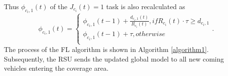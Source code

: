 \documentclass[lettersize,journal,onecolumn]{IEEEtran}
\begin{document}
Thus ${{\phi }_{{{{c}}_{i}},1}}(t)$ of the ${{J}_{{{{c}}_{i}}}}(t)=1$ task is also recalculated as
\begin{equation}
{{\phi }_{{{{c}}_{i}},1}}\left( t \right)=\left\{ \begin{matrix}
   {{\phi }_{{{{c}}_{i}},1}}\left( t-1 \right)+\frac{{{d}_{{{{c}}_{i}},1}}\left( t \right)}{{{R}_{{{{c}}_{i}}}}(t)},{ if }{{{R}}_{{{{c}}_{i}}}}(t)\cdot \tau \ge {{d}_{{{{c}}_{i}},1}}{                   }  \\
   {{\phi }_{{{{c}}_{i}},1}}\left( t-1 \right)+\tau ,{ otherwise                             }  \\
\end{matrix} \right.
\label{eq11}.
\end{equation}
The process of the FL algorithm is shown in Algorithm \ref{algorithm1}. Subsequently, the RSU sends the updated global model to all new coming vehicles entering the coverage area.
\end{document}
